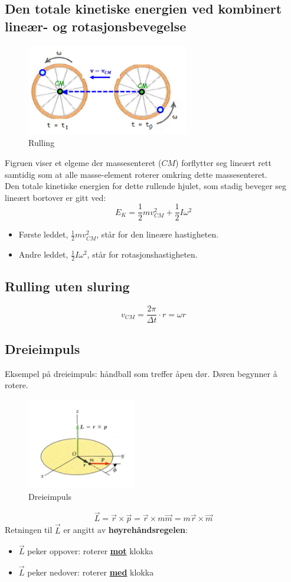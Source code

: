 \documentclass[12pt]{article}
\begin{document}
\subsection{Den totale kinetiske energien ved kombinert lineær- og rotasjonsbevegelse}
\begin{figure} [H]
    \centering
    \includegraphics[height = 4cm]{images/roll.png}
    \caption{Rulling}
\end{figure}
Figruen viser et elgeme der massesenteret ($CM$) forflytter seg lineært rett samtidig som at alle masse-element roterer omkring dette massesenteret.\\
Den totale kinetiske energien for dette rullende hjulet, som stadig beveger seg lineært bortover er gitt ved:
$$E_K = \frac{1}{2}mv^2_{CM}+\frac{1}{2}I\omega^2$$
\begin{itemize}
    \item[] Første leddet, $\frac{1}{2}mv^2_{CM}$, står for den lineære hastigheten.\\
    \item[] Andre leddet, $\frac{1}{2}I\omega^2$, står for rotasjonshastigheten.
\end{itemize}

\subsection{Rulling uten sluring}
$$v_{CM} = \frac{2\pi}{\Delta t} \cdot r = \omega r$$

\subsection{Dreieimpuls}
Eksempel på dreieimpuls: håndball som treffer åpen dør. Døren begynner å rotere.

\begin{figure} [H]
    \centering
    \includegraphics[height = 4cm]{images/dreieimpuls.png}
    \caption{Dreieimpuls}
\end{figure}
$$\Vec{L} = \Vec{r} \times \Vec{p} = \Vec{r} \times m\Vec{m} = m\Vec{r} \times \Vec{m}$$
Retningen til $\Vec{L}$ er angitt av \textbf{høyrehåndsregelen}:
\begin{itemize}
    \item[] $\Vec{L}$ peker oppover: roterer \underline{\textbf{mot}} klokka
    \item[] $\Vec{L}$ peker nedover: roterer \underline{\textbf{med}} klokka
\end{itemize}
\end{document}
